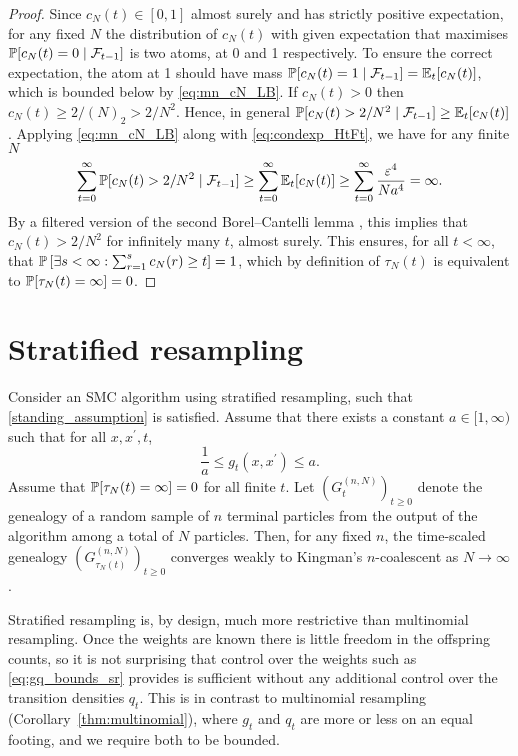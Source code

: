 \begin{proof}
Since $c_N(t) \in [0,1]$ almost surely and has strictly positive expectation, for any fixed $N$ the distribution of $c_N(t)$ with given expectation that maximises $\mathbb{P}[ c_N(t)=0 \mid \mathcal{F}_{t-1} ]$ is two atoms, at 0 and 1 respectively. To ensure the correct expectation, the atom at 1 should have mass $\mathbb{P}[ c_N(t)=1 \mid \mathcal{F}_{t-1} ] = \mathbb{E}_t [ c_N(t) ]$, which is bounded below by \eqref{eq:mn_cN_LB}.
If $c_N(t) > 0$ then $c_N(t) \geq 2/(N)_2 > 2/N^2$. Hence, in general $\mathbb{P}[ c_N(t) > 2/N^2 \mid \mathcal{F}_{t-1} ] \geq \mathbb{E}_t [c_N(t)]$ . Applying \eqref{eq:mn_cN_LB} along with \eqref{eq:condexp_HtFt}, we have for any finite $N$
\begin{equation*}
\sum_{t=0}^\infty \mathbb{P}[ c_N(t) > 2/N^2 \mid \mathcal{F}_{t-1} ]
\geq \sum_{t=0}^\infty \mathbb{E}_t [ c_N(t) ]
\geq \sum_{t=0}^\infty \frac{\varepsilon^4}{Na^4}
= \infty .
\end{equation*}
By a filtered version of the second Borel--Cantelli lemma \parencite[see for example][Theorem 4.3.4]{durrett2019}, this implies that $c_N(t) >2/N^2$ for infinitely many $t$, almost surely.
This ensures, for all $t <\infty$, that $\mathbb{P}\left[ \exists s<\infty : \sum_{r=1}^s c_N(r) \geq t \right] =1$, which by definition of $\tau_N(t)$ is equivalent to $\mathbb{P}[ \tau_N(t) = \infty ] =0$.
\end{proof}




\section{Stratified resampling}

\begin{corollary}\label{thm:stratified}
Consider an SMC algorithm using stratified resampling, such that \ref{standing_assumption} is satisfied.
Assume that there exists a constant $a\in [1,\infty)$ such that for all $x, x^\prime, t$,
\begin{equation}\label{eq:gq_bounds_sr}
\frac{1}{a} \leq g_t(x, x^\prime) \leq a .
\end{equation}
Assume that $\mathbb{P}[ \tau_N(t) = \infty] =0$ for all finite $t$.
Let $(G_t^{(n,N)})_{t\geq0}$ denote the genealogy of a random sample of $n$ terminal particles from the output of the algorithm among a total of $N$ particles. Then, for any fixed $n$, the time-scaled genealogy $(G_{\tau_N(t)}^{(n,N)})_{t\geq0}$ converges weakly to Kingman's $n$-coalescent as $N\to \infty$.%
\end{corollary}
Stratified resampling is, by design, much more restrictive than multinomial resampling. Once the weights are known there is little freedom in the offspring counts, so it is not surprising that control over the weights such as \eqref{eq:gq_bounds_sr} provides is sufficient without any additional control over the transition densities $q_t$. This is in contrast to multinomial resampling (Corollary~\ref{thm:multinomial}), where $g_t$ and $q_t$ are more or less on an equal footing, and we require both to be bounded.

